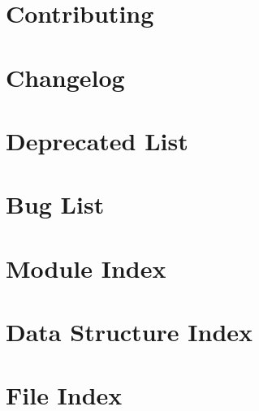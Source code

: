 \let\mypdfximage\pdfximage\def\pdfximage{\immediate\mypdfximage}\documentclass[twoside]{book}
\newcommand{\+}{\discretionary{\mbox{\scriptsize$\hookleftarrow$}}{}{}}
\begin{document}
\chapter{Contributing}
\label{md_CONTRIBUTING}

\chapter{Changelog}
\label{md_CHANGELOG}

\chapter{Deprecated List}
\label{deprecated}

\chapter{Bug List}
\label{bug}

\chapter{Module Index}

\chapter{Data Structure Index}

\chapter{File Index}

\end{document}
